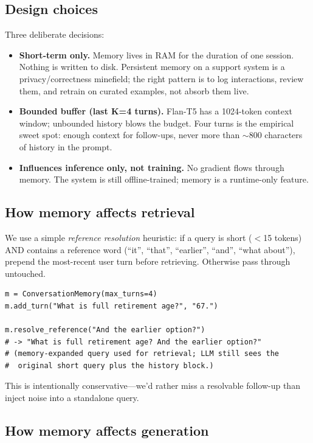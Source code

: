 \documentclass[11pt,a4paper]{article}
\begin{document}
\subsection{Design choices}

Three deliberate decisions:

\begin{itemize}[leftmargin=*, itemsep=2pt]
\item \textbf{Short-term only.} Memory lives in RAM for the duration of one session. Nothing is written to disk. Persistent memory on a support system is a privacy/correctness minefield; the right pattern is to log interactions, review them, and retrain on curated examples, not absorb them live.
\item \textbf{Bounded buffer (last K=4 turns).} Flan-T5 has a 1024-token context window; unbounded history blows the budget. Four turns is the empirical sweet spot: enough context for follow-ups, never more than $\sim$800 characters of history in the prompt.
\item \textbf{Influences inference only, not training.} No gradient flows through memory. The system is still offline-trained; memory is a runtime-only feature.
\end{itemize}

\subsection{How memory affects retrieval}

We use a simple \emph{reference resolution} heuristic: if a query is short ($<$15 tokens) AND contains a reference word (``it'', ``that'', ``earlier'', ``and'', ``what about''), prepend the most-recent user turn before retrieving. Otherwise pass through untouched.

\begin{lstlisting}
m = ConversationMemory(max_turns=4)
m.add_turn("What is full retirement age?", "67.")

m.resolve_reference("And the earlier option?")
# -> "What is full retirement age? And the earlier option?"
# (memory-expanded query used for retrieval; LLM still sees the
#  original short query plus the history block.)
\end{lstlisting}

This is intentionally conservative---we'd rather miss a resolvable follow-up than inject noise into a standalone query.

\subsection{How memory affects generation}
\end{document}
